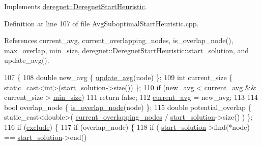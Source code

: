 Implements \hyperlink{classderegnet_1_1DeregnetStartHeuristic_ac296c4f122f7d3ad2fcc2cbb0d1b5379}{deregnet\+::\+Deregnet\+Start\+Heuristic}.



Definition at line 107 of file Avg\+Suboptimal\+Start\+Heuristic.\+cpp.



References current\+\_\+avg, current\+\_\+overlapping\+\_\+nodes, is\+\_\+overlap\+\_\+node(), max\+\_\+overlap, min\+\_\+size, deregnet\+::\+Deregnet\+Start\+Heuristic\+::start\+\_\+solution, and update\+\_\+avg().


\begin{DoxyCode}
107                                                           \{
108     \textcolor{keywordtype}{double} new\_avg \{ \hyperlink{classderegnet_1_1AvgSuboptimalStartHeuristic_a29659ab4864fddd2c226da7e1ada22ef}{update\_avg}(node) \};
109     \textcolor{keywordtype}{int} current\_size \{ \textcolor{keyword}{static\_cast<}\textcolor{keywordtype}{int}\textcolor{keyword}{>}(\hyperlink{classderegnet_1_1DeregnetStartHeuristic_a7450e11ca0a265b055f95e7832b65e2f}{start\_solution}->size()) \};
110     \textcolor{keywordflow}{if} (new\_avg < current\_avg && current\_size > \hyperlink{classderegnet_1_1AvgSuboptimalStartHeuristic_a71b5a73f79c4c161e9df9085ece2c270}{min\_size})
111         \textcolor{keywordflow}{return} \textcolor{keyword}{false};
112     \hyperlink{classderegnet_1_1AvgSuboptimalStartHeuristic_a5c07fde8d2f92daeb4cc33f85e8bf1e2}{current\_avg} = new\_avg;
113 
114     \textcolor{keywordtype}{bool} overlap\_node \{ \hyperlink{classderegnet_1_1AvgSuboptimalStartHeuristic_abc4fa54576da31f3037f2c1aa2cd9140}{is\_overlap\_node}(node) \};
115     \textcolor{keywordtype}{double} potential\_overlap \{ \textcolor{keyword}{static\_cast<}\textcolor{keywordtype}{double}\textcolor{keyword}{>}( \hyperlink{classderegnet_1_1AvgSuboptimalStartHeuristic_ad541b941d327ba928a7951e43ad1fea4}{current\_overlapping\_nodes} / 
      \hyperlink{classderegnet_1_1DeregnetStartHeuristic_a7450e11ca0a265b055f95e7832b65e2f}{start\_solution}->size() ) \};
116     \textcolor{keywordflow}{if} (\hyperlink{classderegnet_1_1DeregnetStartHeuristic_aa22c6581cd404bf7ac325850b28dc951}{exclude}) \{
117         \textcolor{keywordflow}{if} (overlap\_node) \{
118             \textcolor{keywordflow}{if} (   \hyperlink{classderegnet_1_1DeregnetStartHeuristic_a7450e11ca0a265b055f95e7832b65e2f}{start\_solution}->find(*node) == \hyperlink{classderegnet_1_1DeregnetStartHeuristic_a7450e11ca0a265b055f95e7832b65e2f}{start\_solution}->end()

\end{DoxyCode}

